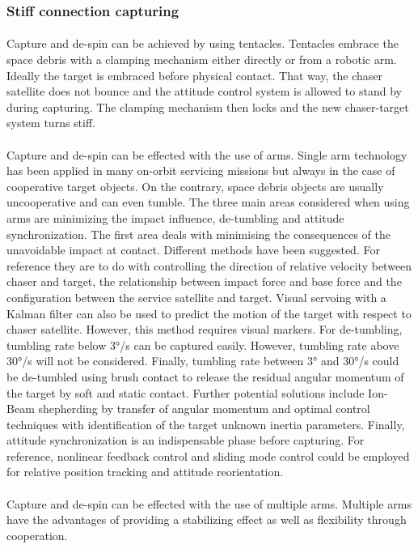 \subsubsection{Stiff connection capturing}
\paragraph{}Capture and de-spin can be achieved by using tentacles. Tentacles embrace the space debris with a clamping mechanism either directly or from a robotic arm.  Ideally the target is embraced before physical contact. That way, the chaser satellite does not bounce and the attitude control system is allowed to stand by during capturing. The clamping mechanism then locks and the new chaser-target system turns stiff.
\paragraph{}Capture and de-spin can be effected with the use of arms. Single arm technology has been applied in many on-orbit servicing missions but always in the case of cooperative target objects. On the contrary, space debris objects are usually uncooperative and can even tumble. The three main areas considered when using arms are minimizing the impact influence, de-tumbling and attitude synchronization. The first area deals with minimising the consequences of the unavoidable impact at contact. Different methods have been suggested. For reference they are to do with controlling the direction of relative velocity between chaser and target, the  relationship between impact force and base force and the configuration between the service satellite and target. Visual servoing with a Kalman filter can also be used to predict the motion of the target with respect to chaser satellite. However, this method requires visual markers. For de-tumbling, tumbling rate below 3°/s can be captured easily. However, tumbling rate above 30°/s will not be considered. Finally, tumbling rate between 3° and 30°/s could be de-tumbled using brush contact to release the residual angular momentum of the target by soft and static contact. Further potential solutions include Ion-Beam shepherding by transfer of angular momentum and optimal control techniques with identification of the target unknown inertia parameters. Finally, attitude synchronization is an indispensable phase before capturing. For reference, nonlinear feedback control and sliding mode control could be employed for relative position tracking and attitude reorientation.
\paragraph{}Capture and de-spin can be effected with the use of multiple arms. Multiple arms have the advantages of providing a stabilizing effect as well as flexibility through cooperation.
